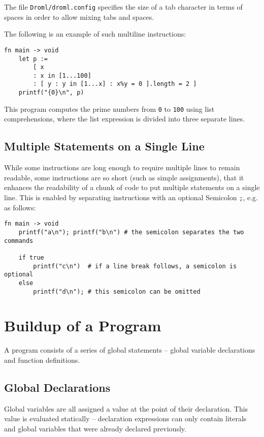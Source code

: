 \documentclass{article}
\newcommand{\code}[1]{\lstinline[columns=fixed]{#1}}
\begin{document}
			The file \texttt{Droml/droml.config} specifies the size of a tab character in terms of spaces in order to allow mixing tabs and spaces.
			
			The following is an example of such multiline instructions:
			
			\begin{lstlisting}
fn main -> void
	let p :=
		[ x
		: x in [1...100]
		: [ y : y in [1...x] : x%y = 0 ].length = 2 ]
	printf("{0}\n", p)
			\end{lstlisting}
			
			This program computes the prime numbers from \code{0} to \code{100} using list comprehensions, where the list expression is divided into three separate lines.
			
		\subsection{Multiple Statements on a Single Line}
		
			While some instructions are long enough to require multiple lines to remain readable, some instructions are so short (such as simple assignments), that it enhances the readability of a chunk of code to put multiple statements on a single line. This is enabled by separating instructions with an optional Semicolon \code{;}, e.g. as follows:
			
			\begin{lstlisting}
fn main -> void
	printf("a\n"); printf("b\n") # the semicolon separates the two commands
	
	if true
		printf("c\n")  # if a line break follows, a semicolon is optional
	else
		printf("d\n"); # this semicolon can be omitted
			\end{lstlisting}
		
	\section{Buildup of a Program}
	
		A program consists of a series of global statements -- global variable declarations and function definitions.
		
		\subsection{Global Declarations}
		
			Global variables are all assigned a value at the point of their declaration. This value is evaluated statically -- declaration expressions can only contain literals and global variables that were already declared previously.
			
\end{document}
